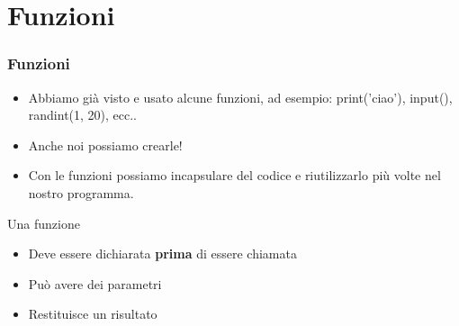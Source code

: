 \section{Funzioni}

\begin{frame}[fragile]
\frametitle{Funzioni}
    \begin{block}{}
        \begin{itemize}
            \item Abbiamo già visto e usato alcune funzioni, ad esempio: print('ciao'), input(), randint(1, 20), ecc..
            \item Anche noi possiamo crearle!
            \item Con le funzioni possiamo incapsulare del codice e riutilizzarlo più volte nel nostro programma.
        \end{itemize}
    \end{block}

    \begin{block}{Una funzione}
        \begin{itemize}
            \item Deve essere dichiarata \textbf{prima} di essere chiamata
            \item Può avere dei parametri
            \item Restituisce un risultato
        \end{itemize}
    \end{block}
\end{frame}

